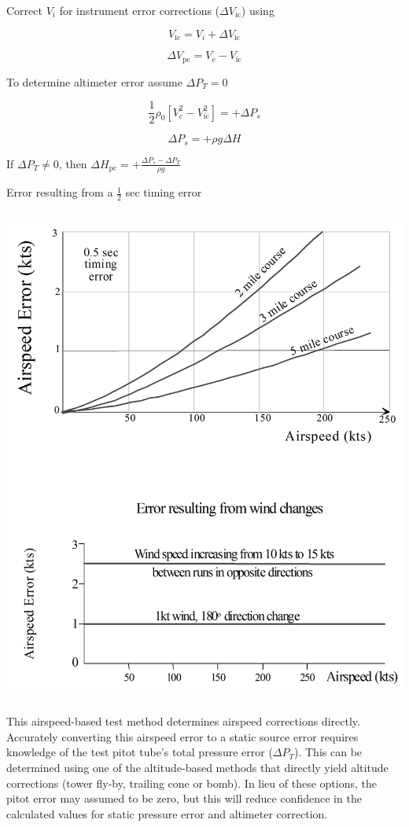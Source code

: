 \documentclass[
]{book}
\begin{document}
Correct \(V_i\) for instrument error corrections (\(\Delta V_{\mathrm{ic}}\)) using

\[V_{\mathrm{ic}} = V_i + \Delta V_{\mathrm{ic}} \]

\[\Delta V_{\mathrm{pc}} = V_c - V_{\mathrm{ic}} \]

To determine altimeter error assume \(\Delta P_T = 0\)

\[\frac{1}{2} \rho_0 \left[ V_c^2 - V_{\mathrm{ic}}^2 \right] = +\Delta P_s \]

\[\Delta P_s = +\rho g \Delta H \]

If \(\Delta P_T \ne 0\), then \(\Delta H_{\mathrm{pc}} = + \frac{\Delta P_s - \Delta P_T}{\rho g}\)

Error resulting from a \(\frac{1}{2}\) sec timing error

\includegraphics[width=5.5125in,height=6.4625in]{media/04/image21.png}

This airspeed-based test method determines airspeed corrections directly. Accurately converting this airspeed error to a static source error requires knowledge of the test pitot tube's total pressure error (\(\Delta P_T\)). This can be determined using one of the altitude-based methods that directly yield altitude corrections (tower fly-by, trailing cone or bomb). In lieu of these options, the pitot error may assumed to be zero, but this will reduce confidence in the calculated values for static pressure error and altimeter correction.
\end{document}
